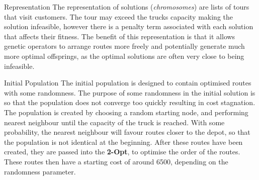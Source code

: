 \documentclass[ %
                    author={Callum Mann},
                     title={Genetic algorithm for the CVRP},
                  subtitle={Capacitated Vehicle Routing Problem},
                      type={Heuristic},
                      year={2016}]{poster}
\begin{document}

\begin{frame}{}


\begin{columns}[t]
  \begin{column}{0.422\linewidth}
    \begin{block}{\Large Representation}
      The representation of solutions (\textit{chromosomes}) are lists of tours that visit
      customers. The tour may exceed the trucks capacity making the solution infeasible,
      however there is a penalty term associated with each solution that affects their fitness.
      The benefit of this representation is that it allows genetic operators to arrange
      routes more freely and potentially generate much more optimal offsprings, as
      the optimal solutions are often very close to being infeasible.


    \end{block}
    \vspace{1cm}

    \begin{block}{\Large Initial Population}
      The initial population is designed to contain optimised routes with some randomness.
      The purpose of some randomness in the initial solution is so that the population does not
      converge too quickly resulting in cost stagnation. \vspace{1cm} \\
      The population is created by choosing a random starting node, and performing nearest neighbour
      until the capacity of the truck is reached. With some probability, the nearest neighbour will favour
      routes closer to the depot, so that the population is not identical at the beginning. After these routes have been
      created, they are passed into the \textbf{2-Opt}, to optimise the order of the routes.
      These routes then have a starting cost of around 6500, depending on the randomness parameter.
    \end{block}
    \vspace{1cm}


\end{column}
\end{columns}
\end{frame}
\end{document}
